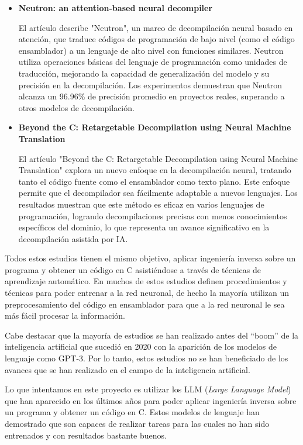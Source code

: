 \begin{itemize}
\item \textbf{Neutron: an attention-based neural decompiler} \cite{LiangRuigang2021Naan}

    El artículo describe "Neutron", un marco de decompilación neural basado en atención,
    que traduce códigos de programación de bajo nivel (como el código ensamblador) a un
    lenguaje de alto nivel con funciones similares. Neutron utiliza operaciones básicas
    del lenguaje de programación como unidades de traducción, mejorando la capacidad de
    generalización del modelo y su precisión en la decompilación. Los experimentos demuestran
    que Neutron alcanza un 96.96\% de precisión promedio en proyectos reales, superando a otros
    modelos de decompilación.

\item \textbf{Beyond the C: Retargetable Decompilation using Neural Machine Translation} \cite{HosseiniIman2022BtCR}

    El artículo "Beyond the C: Retargetable Decompilation using Neural Machine Translation"
    explora un nuevo enfoque en la decompilación neural, tratando tanto el código fuente como
    el ensamblador como texto plano. Este enfoque permite que el decompilador sea fácilmente
    adaptable a nuevos lenguajes. Los resultados muestran que este método es eficaz en varios
    lenguajes de programación, logrando decompilaciones precisas con menos conocimientos específicos
    del dominio, lo que representa un avance significativo en la decompilación asistida por IA.

\end{itemize}

Todos estos estudios tienen el mismo objetivo, aplicar ingeniería inversa sobre un programa
y obtener un código en C asistiéndose a través de técnicas de aprendizaje automático. En muchos
de estos estudios definen procedimientos y técnicas para poder entrenar a la red neuronal, de
hecho la mayoría utilizan un preprocesamiento del código en ensamblador para que a la red
neuronal le sea más fácil procesar la información.

Cabe destacar que la mayoría de estudios se han realizado antes del ``boom'' de la inteligencia artificial
que sucedió en 2020 con la aparición de los modelos de lenguaje como GPT-3. Por lo tanto, estos
estudios no se han beneficiado de los avances que se han realizado en el campo de la inteligencia
artificial.

Lo que intentamos en este proyecto es utilizar los LLM (\textit{Large Language Model}) que han aparecido
en los últimos años para poder aplicar ingeniería inversa sobre un programa y obtener un código
en C. Estos modelos de lenguaje han demostrado que son capaces de realizar tareas para las cuales
no han sido entrenados y con resultados bastante buenos.

